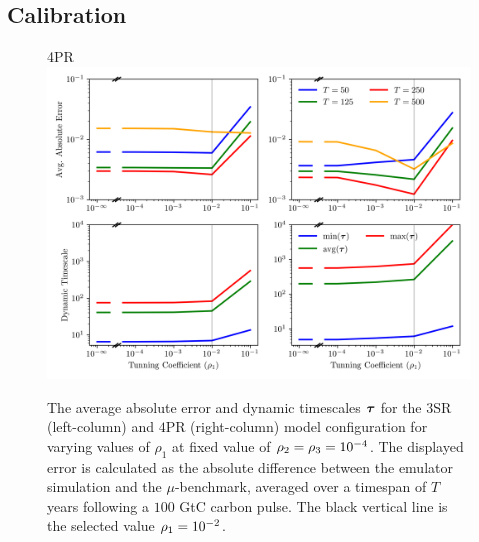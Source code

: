 \documentclass[11pt, a4paper, pdftex, twoside, dvipsnames]{article}
\newcommand{\bb}[1]{\boldsymbol{\bold{#1}}}
\newcommand{\expnum}[2]{
\ifnum#1=1 
  10^{#2} 
\else 
  #1 \! \cdot \! 10^{#2}
\fi
}
\begin{document}
\subsection{Calibration} \label{sec:2.3}

%
\begin{figure}[b]
\centering
{} \raggedright{\hspace{18em}\small{\textsc{4PR}}} 
\includegraphics[width=\textwidth]{fig/analysis_rho_1_sel.png}
\caption{
The average absolute error and dynamic timescales $\bb{\tau}$ for the $3$SR (left-column) and $4$PR (right-column) model configuration for varying values of $\rho_1$ at fixed value of $\rho_2=\rho_3=\expnum{1}{-4}$.
%
The displayed error is calculated as the absolute difference between the emulator simulation and the $\mu$-benchmark, averaged  over a timespan of $T$ years following a $100$ GtC carbon pulse.
%
The black vertical line is the selected value $\rho_1=\expnum{1}{-2}$.
%
}
\label{fig:rho_1_motiv}
\end{figure}
\end{document}
